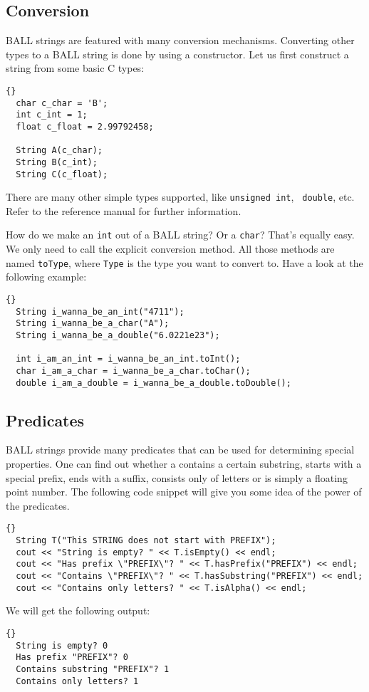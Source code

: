 \subsection{Conversion}

BALL strings are featured with many conversion mechanisms. Converting other
types to a BALL string is done by using a constructor. Let us first construct
a string from some basic C types:
\begin{lstlisting}{}
  char c_char = 'B';
  int c_int = 1;
  float c_float = 2.99792458;

  String A(c_char);
  String B(c_int);
  String C(c_float);
\end{lstlisting}
There are many other simple types supported, like {\tt unsigned int}, {\tt
double}, etc. Refer to the reference manual for further information.

How do we make an {\tt int} out of a BALL string? Or a {\tt char}? That's
equally easy. We only need to call the explicit conversion method. All those
methods are named {\tt toType}, where {\tt Type} is the type you want to
convert to. Have a look at the following example:
\begin{lstlisting}{}
  String i_wanna_be_an_int("4711");
  String i_wanna_be_a_char("A");
  String i_wanna_be_a_double("6.0221e23");

  int i_am_an_int = i_wanna_be_an_int.toInt();
  char i_am_a_char = i_wanna_be_a_char.toChar();
  double i_am_a_double = i_wanna_be_a_double.toDouble();
\end{lstlisting}


\subsection{Predicates}

BALL strings provide many predicates that can be used for determining special
properties. One can find out whether a  contains a certain 
substring, starts with a special prefix, ends with a suffix, consists only of 
letters or is simply a floating point number. The following code snippet will 
give you some idea of the power of the predicates.
\begin{lstlisting}{}
  String T("This STRING does not start with PREFIX");
  cout << "String is empty? " << T.isEmpty() << endl;
  cout << "Has prefix \"PREFIX\"? " << T.hasPrefix("PREFIX") << endl;
  cout << "Contains \"PREFIX\"? " << T.hasSubstring("PREFIX") << endl;
  cout << "Contains only letters? " << T.isAlpha() << endl;
\end{lstlisting}
We will get the following output:
\begin{lstlisting}{}
  String is empty? 0
  Has prefix "PREFIX"? 0
  Contains substring "PREFIX"? 1
  Contains only letters? 1
\end{lstlisting}

